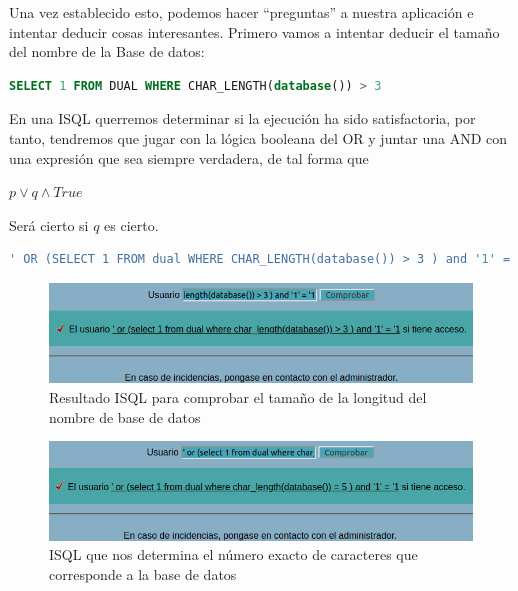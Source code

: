 \documentclass[a4paper,oneside]{article}
\begin{document}
Una vez establecido esto, podemos hacer ``preguntas'' a nuestra aplicación e intentar deducir cosas interesantes. Primero vamos a intentar deducir el tamaño del nombre de la Base de datos:

\begin{lstlisting}[language=SQL, caption={Esta query determina si el nombre de la base de datos es de más de 3 carácteres de longitud}]
SELECT 1 FROM DUAL WHERE CHAR_LENGTH(database()) > 3
\end{lstlisting}

En una ISQL querremos determinar si la ejecución ha sido satisfactoria, por tanto, tendremos que jugar con la lógica booleana del OR y juntar una AND con una expresión que sea siempre verdadera, de tal forma que
\begin{center}
$ p \lor q \land True $
\end{center}
Será cierto si $q$ es cierto.

\begin{lstlisting}[language=SQL, caption={ISQL para determinar si el nombre de la base de datos es de más de 3 caracteres de longitud}]
' OR (SELECT 1 FROM dual WHERE CHAR_LENGTH(database()) > 3 ) and '1' = '1
\end{lstlisting}

\begin{figure}[h!]
  \centering
  \includegraphics[scale=0.6]{images/blindsql3.png}
  \caption{Resultado ISQL para comprobar el tamaño de la longitud del nombre de base de datos}
  \label{fig:blindsql3}
\end{figure}

\begin{figure}[h!]
  \centering
  \includegraphics[scale=0.6]{images/blindsql4.png}
  \caption{ISQL que nos determina el número exacto de caracteres que corresponde a la base de datos}
  \label{fig:blindsql4}
\end{figure}
\end{document}
